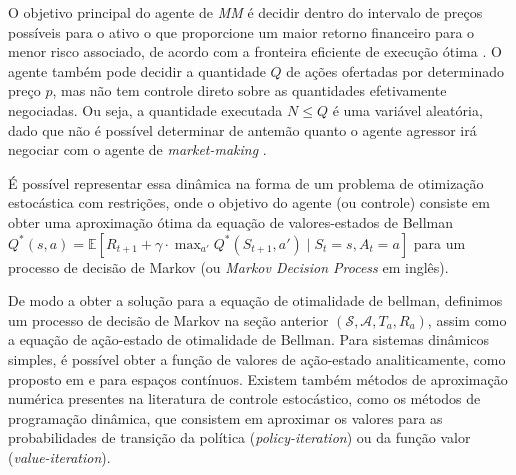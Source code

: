 O objetivo principal do agente de \textit{MM} é decidir dentro do intervalo de preços possíveis para o ativo o que proporcione um maior retorno financeiro para o menor risco associado, de acordo com a fronteira eficiente de execução ótima \citep{almgren2000}. O agente também pode decidir a quantidade $Q$ de ações ofertadas por determinado preço $p$, mas não tem controle direto sobre as quantidades efetivamente negociadas. Ou seja, a quantidade executada $N \leq Q$ é uma variável aleatória, dado que não é possível determinar de antemão quanto o agente agressor irá negociar com o agente de \textit{market-making} \citep{rao2020stochastic}.

É possível representar essa dinâmica na forma de um problema de otimização estocástica com restrições, onde o objetivo do agente (ou controle) consiste em obter uma aproximação ótima da equação de valores-estados de Bellman $Q^*(s, a) = \mathbb{E} \left[ R_{t+1} + \gamma \cdot \max_{a'} Q^*(S_{t+1}, a') \mid S_t = s, A_t = a \right]$ para um processo de decisão de Markov (ou \textit{Markov Decision Process} em inglês).

De modo a obter a solução para a equação de otimalidade de bellman, definimos um processo de decisão de Markov na seção anterior $(\mathcal{S}, \mathcal{A}, T_{a}, R_{a})$, assim como a equação de ação-estado de otimalidade de Bellman. Para sistemas dinâmicos simples, é possível obter a função de valores de ação-estado analiticamente, como proposto em \citep{Avellaneda2008} e \citep{rao2020stochastic} para espaços contínuos. Existem também métodos de aproximação numérica presentes na literatura de controle estocástico, como os métodos de programação dinâmica, que consistem em aproximar os valores para as probabilidades de transição da política (\textit{policy-iteration}) ou da função valor (\textit{value-iteration}).

